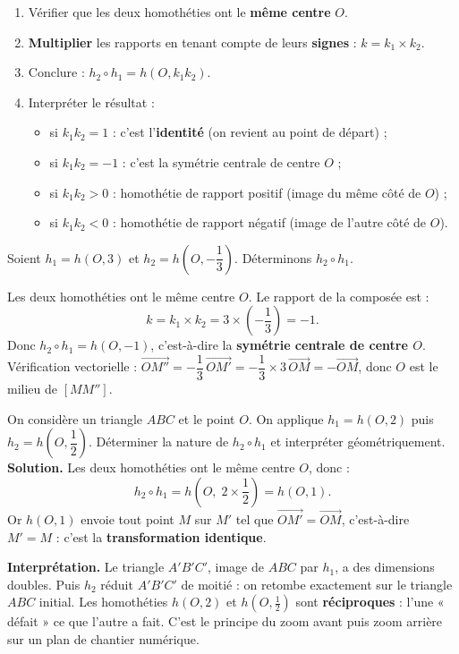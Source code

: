 \documentclass[11pt]{article}
\newcommand{\cle}[1]{{\popxbold\color{popdark}#1}}
\begin{document}
\begin{methode}
\begin{enumerate}
\item Vérifier que les deux homothéties ont le \textbf{même centre} $O$.
\item \textbf{Multiplier} les rapports en tenant compte de leurs \textbf{signes} : $k = k_1 \times k_2$.
\item Conclure : $h_2 \circ h_1 = h(O, k_1 k_2)$.
\item Interpréter le résultat :
\begin{itemize}
\item si $k_1 k_2 = 1$ : c'est l'\textbf{identité} (on revient au point de départ) ;
\item si $k_1 k_2 = -1$ : c'est la \cle{symétrie centrale} de centre $O$ ;
\item si $k_1 k_2 > 0$ : homothétie de rapport positif (image du même côté de $O$) ;
\item si $k_1 k_2 < 0$ : homothétie de rapport négatif (image de l'autre côté de $O$).
\end{itemize}
\end{enumerate}
\end{methode}

\begin{exemplebox}
Soient $h_1 = h(O, 3)$ et $h_2 = h\!\left(O, -\dfrac{1}{3}\right)$. Déterminons $h_2 \circ h_1$.

Les deux homothéties ont le même centre $O$. Le rapport de la composée est :
\[ k = k_1 \times k_2 = 3 \times \left(-\frac{1}{3}\right) = -1. \]
Donc $h_2 \circ h_1 = h(O, -1)$, c'est-à-dire la \textbf{symétrie centrale de centre $O$}. Vérification vectorielle : $\overrightarrow{OM''} = -\dfrac{1}{3}\,\overrightarrow{OM'} = -\dfrac{1}{3}\times 3\,\overrightarrow{OM} = -\overrightarrow{OM}$, donc $O$ est le milieu de $[MM'']$.
\end{exemplebox}

\begin{exoresolu}
On considère un triangle $ABC$ et le point $O$. On applique $h_1 = h(O, 2)$ puis $h_2 = h\!\left(O, \dfrac{1}{2}\right)$. Déterminer la nature de $h_2 \circ h_1$ et interpréter géométriquement.
\tcblower
\textbf{Solution.} Les deux homothéties ont le même centre $O$, donc :
\[ h_2 \circ h_1 = h\!\left(O,\; 2 \times \frac{1}{2}\right) = h(O, 1). \]
Or $h(O,1)$ envoie tout point $M$ sur $M'$ tel que $\overrightarrow{OM'} = \overrightarrow{OM}$, c'est-à-dire $M' = M$ : c'est la \textbf{transformation identique}.

\textbf{Interprétation.} Le triangle $A'B'C'$, image de $ABC$ par $h_1$, a des dimensions doubles. Puis $h_2$ réduit $A'B'C'$ de moitié : on retombe exactement sur le triangle $ABC$ initial. Les homothéties $h(O,2)$ et $h\!\left(O,\tfrac12\right)$ sont \textbf{réciproques} : l'une « défait » ce que l'autre a fait. C'est le principe du zoom avant puis zoom arrière sur un plan de chantier numérique.
\end{exoresolu}
\end{document}
